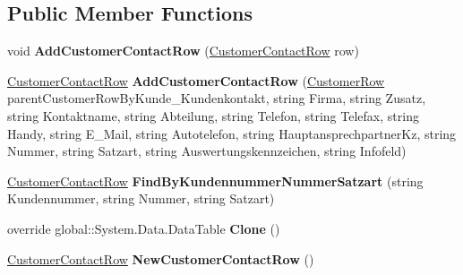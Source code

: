 \subsection*{Public Member Functions}
\begin{DoxyCompactItemize}
\item 
void {\bfseries Add\+Customer\+Contact\+Row} (\hyperlink{class_products_1_1_data_1_1ds_sage_1_1_customer_contact_row}{Customer\+Contact\+Row} row)\hypertarget{class_products_1_1_data_1_1ds_sage_1_1_customer_contact_data_table_a823a3aacf2254bc1b53a5f30646a16cc}{}\label{class_products_1_1_data_1_1ds_sage_1_1_customer_contact_data_table_a823a3aacf2254bc1b53a5f30646a16cc}

\item 
\hyperlink{class_products_1_1_data_1_1ds_sage_1_1_customer_contact_row}{Customer\+Contact\+Row} {\bfseries Add\+Customer\+Contact\+Row} (\hyperlink{class_products_1_1_data_1_1ds_sage_1_1_customer_row}{Customer\+Row} parent\+Customer\+Row\+By\+Kunde\+\_\+\+Kundenkontakt, string Firma, string Zusatz, string Kontaktname, string Abteilung, string Telefon, string Telefax, string Handy, string E\+\_\+\+Mail, string Autotelefon, string Hauptansprechpartner\+Kz, string Nummer, string Satzart, string Auswertungskennzeichen, string Infofeld)\hypertarget{class_products_1_1_data_1_1ds_sage_1_1_customer_contact_data_table_a72f32a84f4cb5406caecb54250496c0a}{}\label{class_products_1_1_data_1_1ds_sage_1_1_customer_contact_data_table_a72f32a84f4cb5406caecb54250496c0a}

\item 
\hyperlink{class_products_1_1_data_1_1ds_sage_1_1_customer_contact_row}{Customer\+Contact\+Row} {\bfseries Find\+By\+Kundennummer\+Nummer\+Satzart} (string Kundennummer, string Nummer, string Satzart)\hypertarget{class_products_1_1_data_1_1ds_sage_1_1_customer_contact_data_table_ae6794a38c54e75924e0ad8c786b794a8}{}\label{class_products_1_1_data_1_1ds_sage_1_1_customer_contact_data_table_ae6794a38c54e75924e0ad8c786b794a8}

\item 
override global\+::\+System.\+Data.\+Data\+Table {\bfseries Clone} ()\hypertarget{class_products_1_1_data_1_1ds_sage_1_1_customer_contact_data_table_ac46179aad1f54c38ff9ab2b3681b17fc}{}\label{class_products_1_1_data_1_1ds_sage_1_1_customer_contact_data_table_ac46179aad1f54c38ff9ab2b3681b17fc}

\item 
\hyperlink{class_products_1_1_data_1_1ds_sage_1_1_customer_contact_row}{Customer\+Contact\+Row} {\bfseries New\+Customer\+Contact\+Row} ()\hypertarget{class_products_1_1_data_1_1ds_sage_1_1_customer_contact_data_table_a0b7cfc5728fc779b55b9949030677426}{}\label{class_products_1_1_data_1_1ds_sage_1_1_customer_contact_data_table_a0b7cfc5728fc779b55b9949030677426}


\end{DoxyCompactItemize}
